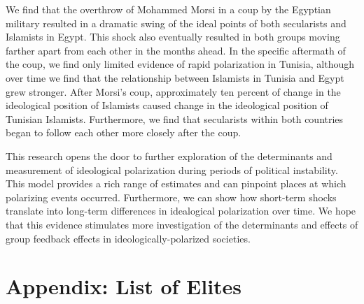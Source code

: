 \documentclass[12pt]{article}
\begin{document}
We find that the overthrow of Mohammed Morsi in a coup by the Egyptian military resulted in a dramatic swing of the ideal points of both secularists and Islamists in Egypt. This shock also eventually resulted in both groups moving farther apart from each other in the months ahead. In the specific aftermath of the coup, we find only limited evidence of rapid polarization in Tunisia, although over time we find that the relationship between Islamists in Tunisia and Egypt grew stronger. After Morsi's coup, approximately ten percent of change in the ideological position of Islamists caused change in the ideological position of Tunisian Islamists. Furthermore, we find that secularists within both countries began to follow each other more closely after the coup.

This research opens the door to further exploration of the determinants and measurement of ideological polarization during periods of political instability. This model provides a rich range of estimates and can pinpoint places at which polarizing events occurred. Furthermore, we can show how short-term shocks translate into long-term differences in idealogical polarization over time. We hope that this evidence stimulates more investigation of the determinants and effects of group feedback effects in ideologically-polarized societies.

\section*{Appendix: List of Elites}
\end{document}
